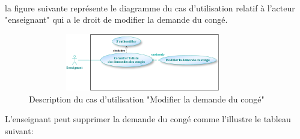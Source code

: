 \documentclass[12 pt ]{report}
\begin{document}
\\
la figure suivante représente le diagramme du cas d'utilisation relatif à l'acteur "enseignant" qui a le droit de modifier la demande du congé.
\begin{figure}[h]
\begin{center}
\includegraphics[width= 10cm , height =2.5cm]{e41.png}
\caption{Description du cas d'utilisation "Modifier la demande du congé"}
\end{center}
\end{figure}
\newpage
L'enseignant peut supprimer la demande du congé comme l'illustre le tableau suivant:
\end{document}
